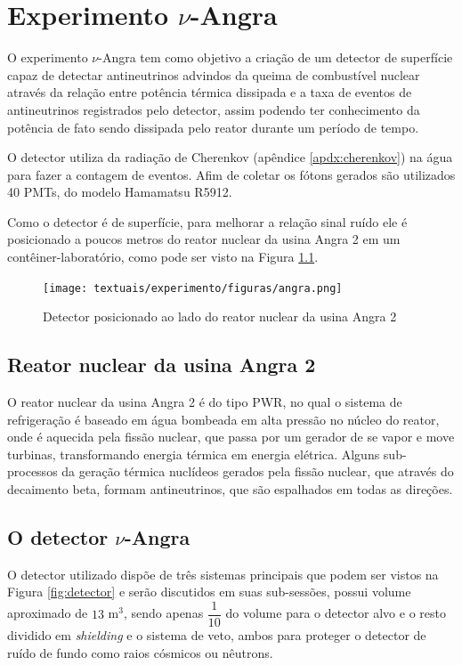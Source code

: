 \chapter{Experimento $\nu$-Angra}\label{cap:experimento}
\vspace{-2cm}

O experimento $\nu$-Angra tem como objetivo a criação de um detector de superfície capaz de detectar antineutrinos advindos da queima de combustível nuclear através da relação entre potência térmica dissipada e a taxa de eventos de antineutrinos registrados pelo detector, assim podendo ter conhecimento da potência de fato sendo dissipada pelo reator durante um período de tempo.

O detector utiliza da radiação de Cherenkov (apêndice \ref{apdx:cherenkov}) na água para fazer a contagem de eventos. Afim de coletar os fótons gerados são utilizados 40 PMTs, do modelo Hamamatsu R5912.

Como o detector é de superfície, para melhorar a relação sinal ruído ele é posicionado a poucos metros do reator nuclear da usina Angra 2 em um contêiner-laboratório, como pode ser visto na Figura \ref{fig:angra}.

\begin{figure}[H]
	\centering
	\texttt{[image: textuais/experimento/figuras/angra.png]}
	\caption{Detector posicionado ao lado do reator nuclear da usina Angra 2}
	\label{fig:angra}
\end{figure}

\section{Reator nuclear da usina Angra 2}

O reator nuclear da usina Angra 2 é do tipo \ac{PWR}, no qual o sistema de refrigeração é baseado em água bombeada em alta pressão no núcleo do reator, onde é aquecida pela fissão nuclear, que passa por um gerador de se vapor e move turbinas, transformando energia térmica em energia elétrica. Alguns sub-processos da geração térmica nuclídeos gerados pela fissão nuclear, que através do decaimento beta, formam antineutrinos, que são espalhados em todas as direções.

\section{O detector $\nu$-Angra} \label{sec:detector}

O detector utilizado dispõe de três sistemas principais que podem ser vistos na Figura \ref{fig:detector} e serão discutidos em suas sub-sessões, possui volume aproximado de $13$ m$^3$, sendo apenas $\dfrac{1}{10}$ do volume para o detector alvo e o resto dividido em \emph{shielding} e o sistema de veto, ambos para proteger o detector de ruído de fundo como raios cósmicos ou nêutrons.


